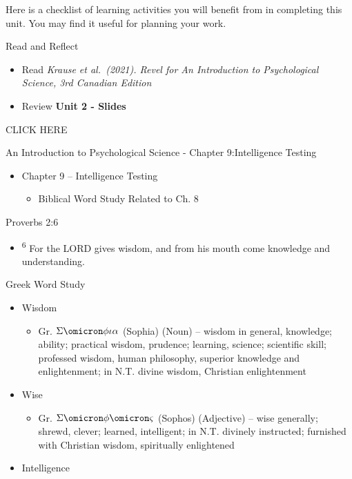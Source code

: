 \documentclass[
]{book}
\providecommand{\tightlist}{%
  \setlength{\itemsep}{0pt}\setlength{\parskip}{0pt}}
\begin{document}
Here is a checklist of learning activities you will benefit from in completing this unit. You may find it useful for planning your work.

\begin{reflect}
{Read and Reflect}

\begin{itemize}
\tightlist
\item
  Read \emph{Krause et al.~(2021). Revel for An Introduction to Psychological Science, 3rd Canadian Edition}\\
\item
  Review \textbf{Unit 2 - Slides}
\end{itemize}

CLICK HERE

An Introduction to Psychological Science - Chapter 9:Intelligence Testing

\begin{itemize}
\tightlist
\item
  Chapter 9 -- Intelligence Testing

  \begin{itemize}
  \tightlist
  \item
    Biblical Word Study Related to Ch. 8
  \end{itemize}
\end{itemize}

Proverbs 2:6

\begin{itemize}
\item
  \textsuperscript{6} For the LORD gives wisdom, and from his mouth come knowledge and understanding.
\end{itemize}

Greek Word Study

\begin{itemize}
\tightlist
\item
  Wisdom

  \begin{itemize}
  \tightlist
  \item
    Gr. \(\Sigma\omicron\phi\iota\alpha\) (Sophia) (Noun) -- wisdom in general, knowledge; ability; practical wisdom, prudence; learning, science; scientific skill; professed wisdom, human philosophy, superior knowledge and enlightenment; in N.T. divine wisdom, Christian enlightenment\\
  \end{itemize}
\item
  Wise

  \begin{itemize}
  \tightlist
  \item
    Gr. \(\Sigma\omicron\phi\omicron\varsigma\) (Sophos) (Adjective) -- wise generally; shrewd, clever; learned, intelligent; in N.T. divinely instructed; furnished with Christian wisdom, spiritually enlightened
  \end{itemize}
\item
  Intelligence


\end{itemize}
\end{reflect}
\end{document}
